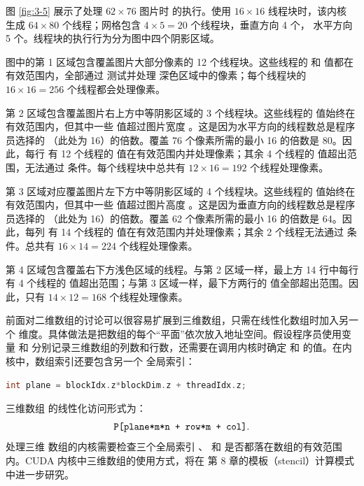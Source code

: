 图 \ref{fig:3-5} 展示了处理 $62\times76$ 图片时
 的执行。使用 $16\times16$ 线程块时，该内核
生成 $64\times80$ 个线程；网格包含 $4\times5=20$ 个线程块，垂直方向 4 个，
水平方向 5 个。线程块的执行行为分为图中四个阴影区域。

图中的第 1 区域包含覆盖图片大部分像素的 12 个线程块。这些线程的
 和  值都在有效范围内，全部通过  测试并处理
深色区域中的像素；每个线程块的 $16\times16=256$ 个线程都会处理像素。

第 2 区域包含覆盖图片右上方中等阴影区域的 3 个线程块。这些线程的
 值始终在有效范围内，但其中一些  值超过图片宽度
。这是因为水平方向的线程数总是程序员选择的 
（此处为 16）的倍数。覆盖 76 个像素所需的最小 16 的倍数是 80。因此，每行
有 12 个线程的  值在有效范围内并处理像素；其余 4 个线程的
 值超出范围，无法通过  条件。每个线程块中总共有
$12\times16=192$ 个线程处理像素。

第 3 区域对应覆盖图片左下方中等阴影区域的 4 个线程块。这些线程的
 值始终在有效范围内，但其中一些  值超过图片高度
。这是因为垂直方向的线程数总是程序员选择的 
（此处为 16）的倍数。覆盖 62 个像素所需的最小 16 的倍数是 64。因此，每列
有 14 个线程的  值在有效范围内并处理像素；其余 2 个线程无法通过
 条件。总共有 $16\times14=224$ 个线程处理像素。

第 4 区域包含覆盖右下方浅色区域的线程。与第 2 区域一样，最上方 14 行中每行
有 4 个线程的  值超出范围；与第 3 区域一样，最下方两行的
 值全部超出范围。因此，只有 $14\times12=168$ 个线程处理像素。

前面对二维数组的讨论可以很容易扩展到三维数组，只需在线性化数组时加入另一个
维度。具体做法是把数组的每个“平面”依次放入地址空间。假设程序员使用变量
 和  分别记录三维数组的列数和行数，还需要在调用内核时确定
 和  的值。在内核中，数组索引还要包含另一个
全局索引：

\begin{lstlisting}[language=C++]
int plane = blockIdx.z*blockDim.z + threadIdx.z;
\end{lstlisting}

三维数组  的线性化访问形式为：
\[
  \code{P[plane*m*n + row*m + col]}.
\]
处理三维  数组的内核需要检查三个全局索引 、 和
 是否都落在数组的有效范围内。CUDA 内核中三维数组的使用方式，将在
第 8 章的模板（stencil）计算模式中进一步研究。

